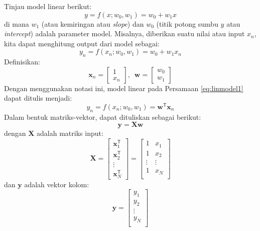 \documentclass[a4paper,11pt,bahasa]{article} %
\begin{document}
Tinjau model linear berikut:
\begin{equation}
y = f(x; w_{0}, w_{1}) = w_{0} + w_{1}x
\end{equation}
di mana $w_{1}$ (atau kemiringan atau \textit{slope}) dan $w_{0}$
(titik potong sumbu $y$ atau \textit{intercept}) adalah parameter model.
Misalnya, diberikan suatu nilai atau input $x_{n}$, kita dapat menghitung output dari model
sebagai:
\begin{equation}
y_{n} = f(x_{n}; w_{0}, w_{1}) = w_{0} + w_{1}x_{n}
\label{eq:linmodel1}
\end{equation}
Definisikan:
\begin{equation}
\mathbf{x}_{n} = \begin{bmatrix}
1 \\
x_{n}
\end{bmatrix}
,\,\,\,%
\mathbf{w} = \begin{bmatrix}
w_{0} \\
w_{1}
\end{bmatrix}
\end{equation}
Dengan menggunakan notasi ini, model linear pada Persamaan \eqref{eq:linmodel1} dapat ditulis
menjadi:
\begin{equation}
y_{n} = f(x_{n}; w_0, w_1) = \mathbf{w}^{\mathsf{T}} \mathbf{x}_{n}
\label{eq:linmodel2}
\end{equation}
Dalam bentuk matriks-vektor, dapat dituliskan sebagai berikut:
\begin{equation}
\mathbf{y} = \mathbf{X}\mathbf{w}
\end{equation}
dengan $\mathbf{X}$ adalah matriks input:
\begin{equation}
\mathbf{X} = \begin{bmatrix}
\mathbf{x}^{\mathsf{T}}_{1} \\
\mathbf{x}^{\mathsf{T}}_{2} \\
\vdots \\
\mathbf{x}^{\mathsf{T}}_{N}
\end{bmatrix} =
\begin{bmatrix}
1 & x_{1} \\
1 & x_{2} \\
\vdots & \vdots \\
1 & x_{N} \\
\end{bmatrix}
\end{equation}
dan $\mathbf{y}$ adalah vektor kolom:
\begin{equation}
\mathbf{y} =
\begin{bmatrix}
y_{1} \\
y_{2} \\
\vdots \\
y_{N} \\
\end{bmatrix}
\end{equation}
\end{document}
